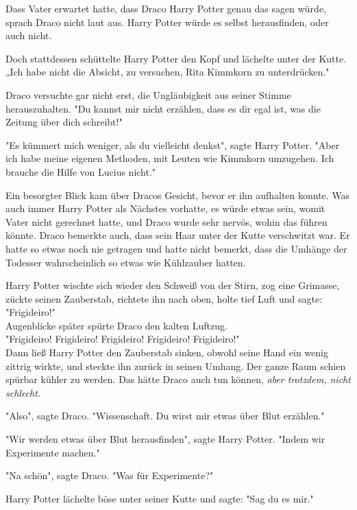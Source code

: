 {Dass Vater erwartet hatte, dass Draco Harry Potter genau das sagen würde, sprach Draco nicht laut aus. Harry Potter würde es selbst herausfinden, oder auch nicht.

Doch stattdessen schüttelte Harry Potter den Kopf und lächelte unter der Kutte.\\ „Ich habe nicht die Absicht, zu versuchen, Rita Kimmkorn zu unterdrücken."

Draco versuchte gar nicht erst, die Ungläubigkeit aus seiner Stimme herauszuhalten. "Du kannst mir nicht erzählen, dass es dir egal ist, was die Zeitung über dich schreibt!"

"Es kümmert mich weniger, als du vielleicht denkst", sagte Harry Potter. "Aber ich habe meine eigenen Methoden, mit Leuten wie Kimmkorn umzugehen. Ich brauche die Hilfe von Lucius nicht."

Ein besorgter Blick kam über Dracos Gesicht, bevor er ihn aufhalten konnte. Was auch immer Harry Potter als Nächstes vorhatte, es würde etwas sein, womit Vater nicht gerechnet hatte, und Draco wurde sehr nervös, wohin das führen könnte. Draco bemerkte auch, dass sein Haar unter der Kutte verschwitzt war. Er hatte so etwas noch nie getragen und hatte nicht bemerkt, dass die Umhänge der Todesser wahrscheinlich so etwas wie Kühlzauber hatten.

Harry Potter wischte sich wieder den Schweiß von der Stirn, zog eine Grimasse, zückte seinen Zauberstab, richtete ihn nach oben, holte tief Luft und sagte: "Frigideiro!"\\ Augenblicke später spürte Draco den kalten Luftzug.\\ "Frigideiro! Frigideiro! Frigideiro! Frigideiro! Frigideiro!"\\ Dann ließ Harry Potter den Zauberstab sinken, obwohl seine Hand ein wenig zittrig wirkte, und steckte ihn zurück in seinen Umhang. Der ganze Raum schien spürbar kühler zu werden. Das hätte Draco auch tun können, \emph{aber trotzdem, nicht schlecht.}

"Also", sagte Draco. "Wissenschaft. Du wirst mir etwas über Blut erzählen."

"Wir werden etwas über Blut herausfinden", sagte Harry Potter. "Indem wir Experimente machen."

"Na schön", sagte Draco. "Was für Experimente?"

Harry Potter lächelte böse unter seiner Kutte und sagte: "Sag du es mir."

}
